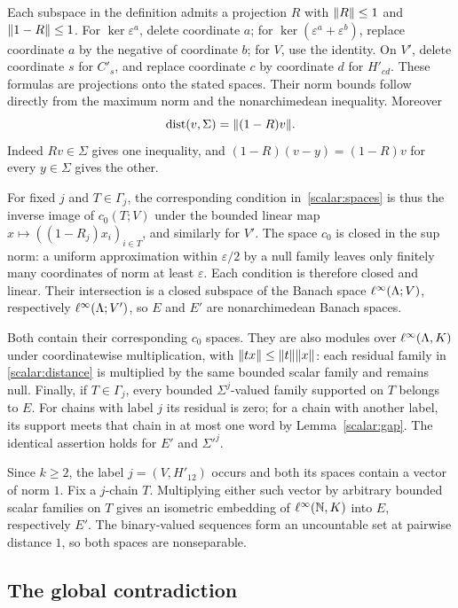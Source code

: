 Each subspace in the definition admits a projection $R$ with $\lVert R\rVert\le1$ and $\lVert 1-R\rVert\le1$.
For $\ker\varepsilon^a$, delete coordinate $a$; for $\ker(\varepsilon^a+\varepsilon^b)$, replace coordinate
$a$ by the negative of coordinate $b$; for $V$, use the identity. On $V'$, delete coordinate $s$ for
$C'_s$, and replace coordinate $c$ by coordinate $d$ for $H'_{cd}$. These formulas are projections onto
the stated spaces. Their norm bounds follow directly from the maximum norm and the nonarchimedean
inequality. Moreover
\begin{equation}\label{scalar:distance}
 \operatorname{dist}(v,\Sigma)=\lVert (1-R)v\rVert.
\end{equation}
Indeed $Rv\in\Sigma$ gives one inequality, and $(1-R)(v-y)=(1-R)v$ for every $y\in\Sigma$ gives the other.

For fixed $j$ and $T\in\Gamma_j$, the corresponding condition in~\eqref{scalar:spaces} is thus the inverse
image of $c_0(T;V)$ under the bounded linear map $x\mapsto((1-R_j)x_i)_{i\in T}$, and similarly for $V'$.
The space $c_0$ is closed in the sup norm: a uniform approximation within $\varepsilon/2$ by a null family
leaves only finitely many coordinates of norm at least $\varepsilon$. Each condition is therefore closed
and linear. Their intersection is a closed subspace of the Banach space $\ell^\infty(\Lambda;V)$, respectively
$\ell^\infty(\Lambda;V')$, so $E$ and $E'$ are nonarchimedean Banach spaces.

Both contain their corresponding $c_0$ spaces. They are also modules over $\ell^\infty(\Lambda,K)$ under
coordinatewise multiplication, with $\lVert tx\rVert\le\lVert t\rVert\lVert x\rVert$: each residual family in
\eqref{scalar:distance} is multiplied by the same bounded scalar family and remains null.
Finally, if $T\in\Gamma_j$, every bounded $\Sigma^j$\nobreakdash-valued family supported on $T$ belongs
to $E$. For chains with label $j$ its residual is zero; for a chain with another label, its support meets
that chain in at most one word by Lemma~\ref{scalar:gap}. The identical assertion holds for $E'$ and
$\Sigma'^j$.

Since $k\ge2$, the label $j=(V,H'_{12})$ occurs and both its spaces contain a vector of norm $1$.
Fix a $j$-chain $T$. Multiplying either such vector by arbitrary bounded scalar families on $T$ gives
an isometric embedding of $\ell^\infty(\mathbb N,K)$ into $E$, respectively $E'$. The binary-valued sequences form
an uncountable set at pairwise distance $1$, so both spaces are nonseparable.

\subsection{The global contradiction}

